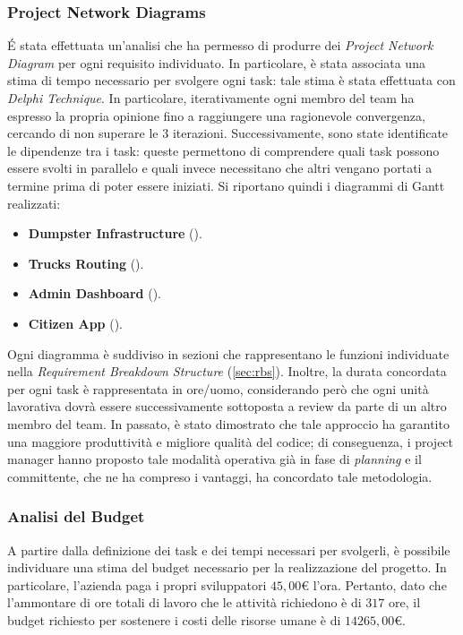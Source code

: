 \subsubsection{Project Network Diagrams}
\'E stata effettuata un'analisi che ha permesso di produrre dei \textit{Project Network Diagram} per ogni requisito individuato.
In particolare, è stata associata una stima di tempo necessario per svolgere ogni task: tale stima è stata effettuata con \textit{Delphi Technique}.
In particolare, iterativamente ogni membro del team ha espresso la propria opinione fino a raggiungere una ragionevole convergenza, cercando di non superare le 3 iterazioni.
Successivamente, sono state identificate le dipendenze tra i task: queste permettono di comprendere quali task possono essere svolti in parallelo e quali invece necessitano che altri vengano portati a termine prima di poter essere iniziati.
Si riportano quindi i diagrammi di Gantt realizzati:
\begin{itemize}
    \item \textbf{Dumpster Infrastructure} ().
    \item \textbf{Trucks Routing} ().
    \item \textbf{Admin Dashboard} ().
    \item \textbf{Citizen App} ().
\end{itemize}
Ogni diagramma è suddiviso in sezioni che rappresentano le funzioni individuate nella \textit{Requirement Breakdown Structure} (\ref{sec:rbs}).
Inoltre, la durata concordata per ogni task è rappresentata in ore/uomo, considerando però che ogni unità lavorativa dovrà essere successivamente sottoposta a review da parte di un altro membro del team.
In passato, è stato dimostrato che tale approccio ha garantito una maggiore produttività e migliore qualità del codice; di conseguenza, i project manager hanno proposto tale modalità operativa già in fase di \textit{planning} e il committente, che ne ha compreso i vantaggi, ha concordato tale metodologia.

\subsubsection{Analisi del Budget}
A partire dalla definizione dei task e dei tempi necessari per svolgerli, è possibile individuare una stima del budget necessario per la realizzazione del progetto.
In particolare, l'azienda paga i propri sviluppatori $45,00$\euro{} l'ora.
Pertanto, dato che l'ammontare di ore totali di lavoro che le attività richiedono è di $317$ ore, il budget richiesto per sostenere i costi delle risorse umane è di $14265,00$\euro{}.

